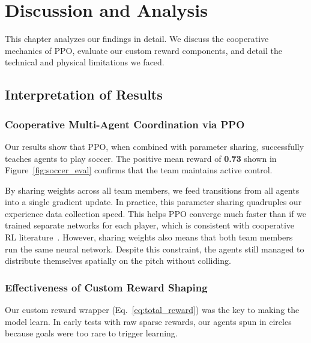 \chapter{Discussion and Analysis}
\label{ch:evaluation}

This chapter analyzes our findings in detail. We discuss the cooperative mechanics of PPO, evaluate our custom reward components, and detail the technical and physical limitations we faced.

\section{Interpretation of Results}
\label{sec:interpretation}

\subsection{Cooperative Multi-Agent Coordination via PPO}
\label{subsec:disc_ppo}

Our results show that PPO, when combined with parameter sharing, successfully teaches agents to play soccer. The positive mean reward of \textbf{0.73} shown in Figure~\ref{fig:soccer_eval} confirms that the team maintains active control. 

By sharing weights across all team members, we feed transitions from all agents into a single gradient update. In practice, this parameter sharing quadruples our experience data collection speed. This helps PPO converge much faster than if we trained separate networks for each player, which is consistent with cooperative RL literature~\citep{gupta2017cooperative}. However, sharing weights also means that both team members run the same neural network. Despite this constraint, the agents still managed to distribute themselves spatially on the pitch without colliding.

\subsection{Effectiveness of Custom Reward Shaping}
\label{subsec:disc_reward_shaping}

Our custom reward wrapper (Eq.~\eqref{eq:total_reward}) was the key to making the model learn. In early tests with raw sparse rewards, our agents spun in circles because goals were too rare to trigger learning. 

